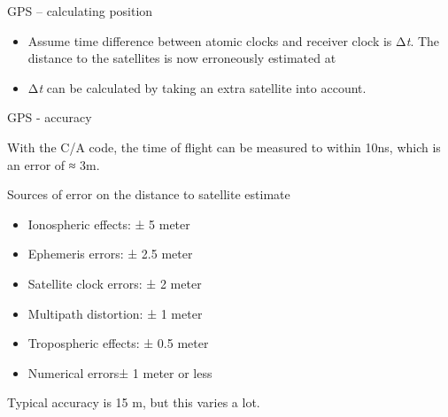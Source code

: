 \documentclass[compress]{beamer}
\providecommand{\tightlist}{%
  \setlength{\itemsep}{0pt}\setlength{\parskip}{0pt}}
\begin{document}
\begin{frame}{GPS -- calculating position}

\begin{itemize}
\tightlist
\item
  Assume time difference between atomic clocks and receiver clock is
  Δ\emph{t}. The distance to the satellites is now erroneously estimated
  at
\item
  Δ\emph{t} can be calculated by taking an extra satellite into account.
\end{itemize}

\end{frame}

\begin{frame}{GPS - accuracy}

With the C/A code, the time of flight can be measured to within 10ns,
which is an error of ≈ 3m.

Sources of error on the distance to satellite estimate

\begin{itemize}
\tightlist
\item
  Ionospheric effects: ± 5 meter
\item
  Ephemeris errors: ± 2.5 meter
\item
  Satellite clock errors: ± 2 meter
\item
  Multipath distortion: ± 1 meter
\item
  Tropospheric effects: ± 0.5 meter
\item
  Numerical errors± 1 meter or less
\end{itemize}

Typical accuracy is 15 m, but this varies a lot.

\end{frame}
\end{document}
